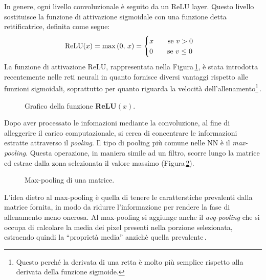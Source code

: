 In genere, ogni livello convoluzionale è seguito da un \acs{ReLU} layer. Questo livello sostituisce la funzione di attivazione sigmoidale con una funzione detta rettificatrice, definita come segue:
% 
\begin{gather*}
    \text{ReLU}(x) = \max{\left(0,\,x\right)} = 
    \begin{cases}
        x \hspace{20px} \text{se } v>0\\
        0 \hspace{20px} \text{se } v\leq0
    \end{cases}
\end{gather*}
% 
\noindent La funzione di attivazione \acs{ReLU}, rappresentata nella Figura\,\ref{fig:relu-function}, è stata introdotta recentemente nelle reti neurali in quanto fornisce diversi vantaggi rispetto alle funzioni sigmoidali, soprattutto per quanto riguarda la velocità dell'allenamento\footnote{Questo perché la derivata di una retta è molto più semplice rispetto alla derivata della funzione sigmoide.}\,\cite{aggarwal2018neural}.
% 
\begin{figure}[!b]
    \centering
    
    \caption[Grafico della funzione \textsl{ReLU}$(x)$.]{Grafico della funzione \textbf{ReLU}$(x)$.}\label{fig:relu-function}
\end{figure}

Dopo aver processato le infomazioni mediante la convoluzione, al fine di alleggerire il carico computazionale, si cerca di concentrare le informazioni estratte attraverso il \textit{pooling}. Il tipo di pooling più comune nelle \acs{NN} è il \textit{max-pooling}. Questa operazione, in maniera simile ad un filtro, scorre lungo la matrice ed estrae dalla zona selezionata il valore massimo (Figura\,\ref{fig:max-pooling-operation}).
% 
\begin{figure}[!b]
    \centering
    
    \caption[Max-pooling di una matrice.]{Max-pooling di una matrice.}\label{fig:max-pooling-operation}
\end{figure}
% 
L'idea dietro al max-pooling è quella di tenere le caratterstiche prevalenti dalla matrice fornita, in modo da ridurre l'informazione per rendere la fase di allenamento meno onerosa. Al max-pooling si aggiunge anche il \textit{avg-pooling} che si occupa di calcolare la media dei pixel presenti nella porzione selezionata, estraendo quindi la ``proprietà media'' anzichè quella prevalente\,\cite{aggarwal2018neural}.

